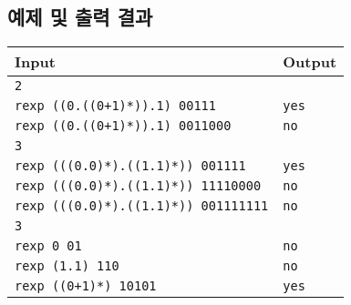 \documentclass{article}
\begin{document}
\begin{multicols}{2}
\section{예제 및 출력 결과}
\begin{center}
	\begin{tabular}{l|l}
	\toprule
	Input & Output \\ \toprule
	\texttt{2} & \\
	\texttt{rexp ((0.((0+1)*)).1) 00111} & \texttt{yes}\\
	\texttt{rexp ((0.((0+1)*)).1) 0011000}& \texttt{no} \\ \midrule
	\texttt{3} & \\
	\texttt{rexp (((0.0)*).((1.1)*)) 001111} & \texttt{yes}\\
	\texttt{rexp (((0.0)*).((1.1)*)) 11110000} & \texttt{no} \\
	\texttt{rexp (((0.0)*).((1.1)*)) 001111111} & \texttt{no} \\ \midrule
	\texttt{3} & \\
	\texttt{rexp 0 01} & \texttt{no} \\ 
	\texttt{rexp (1.1) 110} & \texttt{no} \\
	\texttt{rexp ((0+1)*) 10101} & \texttt{yes} \\ \bottomrule
	
	\end{tabular}
\end{center}

\end{multicols}
\end{document}
